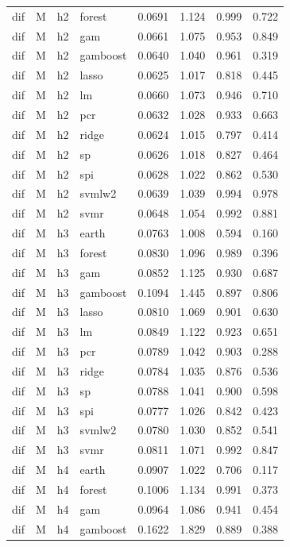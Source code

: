 \begin{ThreePartTable}
\begin{longtable}[t]{llclcccc}
dif & M & h2 & forest & 0.0691 & 1.124 & 0.999 & 0.722\\
dif & M & h2 & gam & 0.0661 & 1.075 & 0.953 & 0.849\\
dif & M & h2 & gamboost & 0.0640 & 1.040 & 0.961 & 0.319\\
dif & M & h2 & lasso & 0.0625 & 1.017 & 0.818 & 0.445\\
dif & M & h2 & lm & 0.0660 & 1.073 & 0.946 & 0.710\\
dif & M & h2 & pcr & 0.0632 & 1.028 & 0.933 & 0.663\\
dif & M & h2 & ridge & 0.0624 & 1.015 & 0.797 & 0.414\\
dif & M & h2 & sp & 0.0626 & 1.018 & 0.827 & 0.464\\
dif & M & h2 & spi & 0.0628 & 1.022 & 0.862 & 0.530\\
dif & M & h2 & svmlw2 & 0.0639 & 1.039 & 0.994 & 0.978\\
dif & M & h2 & svmr & 0.0648 & 1.054 & 0.992 & 0.881\\
\addlinespace
dif & M & h3 & earth & 0.0763 & 1.008 & 0.594 & 0.160\\
dif & M & h3 & forest & 0.0830 & 1.096 & 0.989 & 0.396\\
dif & M & h3 & gam & 0.0852 & 1.125 & 0.930 & 0.687\\
dif & M & h3 & gamboost & 0.1094 & 1.445 & 0.897 & 0.806\\
dif & M & h3 & lasso & 0.0810 & 1.069 & 0.901 & 0.630\\
dif & M & h3 & lm & 0.0849 & 1.122 & 0.923 & 0.651\\
dif & M & h3 & pcr & 0.0789 & 1.042 & 0.903 & 0.288\\
dif & M & h3 & ridge & 0.0784 & 1.035 & 0.876 & 0.536\\
dif & M & h3 & sp & 0.0788 & 1.041 & 0.900 & 0.598\\
dif & M & h3 & spi & 0.0777 & 1.026 & 0.842 & 0.423\\
dif & M & h3 & svmlw2 & 0.0780 & 1.030 & 0.852 & 0.541\\
dif & M & h3 & svmr & 0.0811 & 1.071 & 0.992 & 0.847\\
\addlinespace
dif & M & h4 & earth & 0.0907 & 1.022 & 0.706 & 0.117\\
dif & M & h4 & forest & 0.1006 & 1.134 & 0.991 & 0.373\\
dif & M & h4 & gam & 0.0964 & 1.086 & 0.941 & 0.454\\
dif & M & h4 & gamboost & 0.1622 & 1.829 & 0.889 & 0.388\\

\end{longtable}
\end{ThreePartTable}
